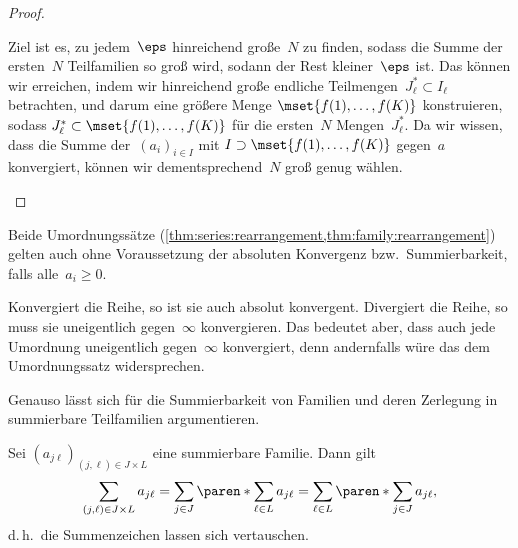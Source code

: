 \documentclass[a4paper]{article}
\begin{document}
\begin{proof}
\begin{enumerate}
{\begin{center}
              \end{center}
              Ziel ist es, zu jedem~$\eps$ hinreichend große~$N$ zu finden, sodass die Summe der ersten~$N$ Teilfamilien so groß wird, sodann der Rest kleiner~$\eps$ ist. Das können wir erreichen, indem wir hinreichend große endliche Teilmengen~$J^*_\ell \subset I_\ell$ betrachten, und darum eine größere Menge $\mset{f(1),\dots,f(K)}$ konstruieren, sodass $J^*_\ell \subset \mset{f(1),\dots,f(K)}$ für die ersten~$N$ Mengen~$J^*_\ell$. Da wir wissen, dass die Summe der~$(a_i)_{i\in I}$ mit $I \supset  \mset{f(1),\dots,f(K)}$ gegen~$a$ konvergiert, können wir dementsprechend~$N$ groß genug wählen. 
              }\qedhere
    \end{enumerate}
\end{proof}

\begin{remark}
    Beide Umordnungssätze (\cref{thm:series:rearrangement,thm:family:rearrangement}) gelten auch ohne Voraussetzung der absoluten Konvergenz bzw.\ Summierbarkeit, falls alle~$a_i \geq 0$.
    
    Konvergiert die Reihe, so ist sie auch absolut konvergent. Divergiert die Reihe, so muss sie uneigentlich gegen~$\infty$ konvergieren. Das bedeutet aber, dass auch jede Umordnung uneigentlich gegen~$\infty$ konvergiert, denn andernfalls würe das dem Umordnungssatz widersprechen.
    
    Genauso lässt sich für die Summierbarkeit von Familien und deren Zerlegung in summierbare Teilfamilien argumentieren.
\end{remark}

\begin{corollary}[Doppelreihensatz]
    Sei $(a_{j\ell})_{(j,\ell)\in J\times L}$ eine summierbare Familie. Dann gilt
    \begin{equation*}
        \sum_{(j,\ell)\in J\times L} a_{j\ell} = \sum_{j\in J} \paren*{\sum_{\ell\in L} a_{j\ell}} = \sum_{\ell\in L} \paren*{\sum_{j\in J} a_{j\ell}},
    \end{equation*}
    d.\,h.\ die Summenzeichen lassen sich vertauschen.
\end{corollary}
\end{document}

